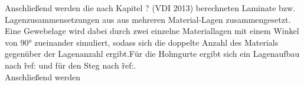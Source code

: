 \noindent Anschließend werden die nach Kapitel ? (VDI 2013) berechneten Laminate bzw. Lagenzusammensetzungen aus aus mehreren Material-Lagen zusammengesetzt. Eine Gewebelage wird dabei durch zwei einzelne Materiallagen mit einem Winkel von $90°$ zueinander simuliert, sodass sich die doppelte Anzahl des Materials gegenüber der Lagenanzahl ergibt.Für die Holmgurte ergibt sich ein Lagenaufbau nach \~{ref:} und für den Steg nach \~{ref:}.\\ 

\noindent Anschließend werden 
